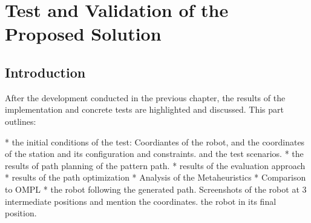 \chapter{Test and Validation of the Proposed Solution }

\renewcommand{\chaptername}{Chapter}

\section*{Introduction}
After the development conducted in the previous chapter, the results of the implementation 
and concrete tests are highlighted and discussed.
This part outlines:

* the initial conditions of the test: Coordiantes of the robot, and the coordinates of the station 
and its configuration and constraints. and the test scenarios.
* the results of path planning of the pattern path. 
* results of the evaluation approach 
* results of the path optimization
* Analysis of the Metaheuristics
* Comparison to OMPL
* the robot following the generated path. Screenshots of the robot at 3 intermediate positions and mention 
the coordinates. the robot in its final position.

